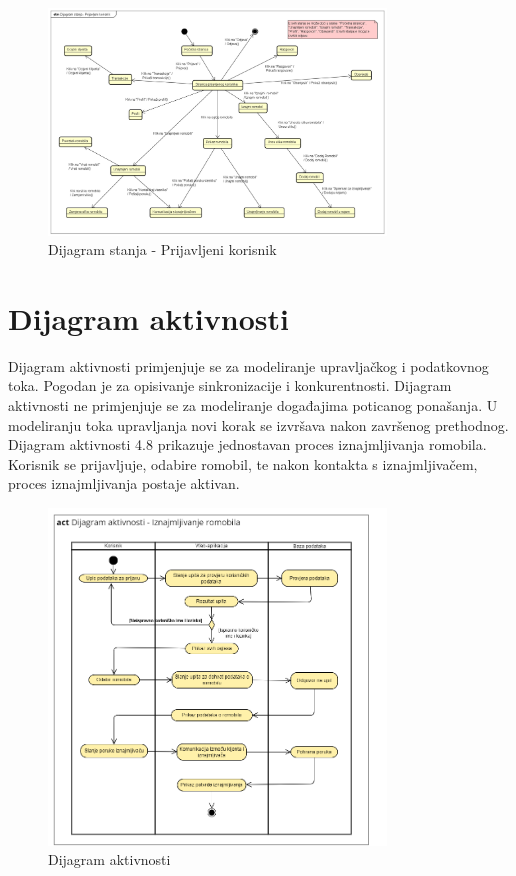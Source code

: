 		
			\begin{figure}[H]
				\centering
				\includegraphics[width=0.8\textwidth]{dijagrami/DijagramStanja-PrijavljeniKorisnik.png}
				\caption{Dijagram stanja - Prijavljeni korisnik}
				\label{fig:your_label}
			\end{figure}
			
			
			\eject 
		
		\section{Dijagram aktivnosti}
			
			\indent Dijagram aktivnosti primjenjuje se za modeliranje upravljačkog i podatkovnog toka. Pogodan je za opisivanje sinkronizacije i konkurentnosti. Dijagram aktivnosti ne primjenjuje se za modeliranje događajima poticanog ponašanja. U modeliranju toka upravljanja novi korak se izvršava nakon završenog prethodnog. \\
			
			\indent Dijagram aktivnosti 4.8 prikazuje jednostavan proces iznajmljivanja romobila. 
			Korisnik se prijavljuje, odabire romobil, te nakon kontakta s iznajmljivačem, proces iznajmljivanja postaje aktivan. \\
			
			\begin{figure}[H]
				\centering
				\includegraphics[width=0.8\textwidth]{dijagrami/aktivnost.png}
				\caption{Dijagram aktivnosti}
				\label{fig:your_label}
			\end{figure}
			
